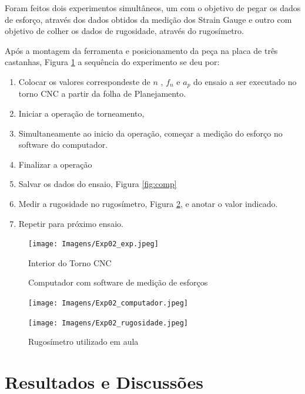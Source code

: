 \documentclass[deposito, acronym, symbols]{fei}
\begin{document}
Foram feitos dois experimentos simultâneos, um com o objetivo de pegar os dados de esforço, através dos dados obtidos da medição dos Strain Gauge e outro com objetivo de colher os dados de rugosidade, através do rugosímetro.

Após a montagem da ferramenta e posicionamento da peça na placa de três castanhas, Figura \ref{fig:exp} a sequência do experimento se deu por: 

\begin{enumerate}
    \item Colocar os valores correspondeste de $n$ , $f_n$ e $a_p$ do ensaio a ser executado no torno CNC a partir da folha de Planejamento.
    \item Iniciar a operação de torneamento,
    \item Simultaneamente ao inicio da operação, começar a medição do esforço no software do computador.
    \item Finalizar a operação
    \item Salvar os dados do ensaio, Figura \ref{fig:comp}
    \item Medir a rugosidade no rugosímetro, Figura \ref{fig:rugo}, e anotar o valor indicado.
    \item Repetir para próximo ensaio.
\end{enumerate}

\begin{figure}[!htp]
    \centering
    \caption{Interior do Torno CNC}
    \texttt{[image: Imagens/Exp02\_exp.jpeg]}
    \label{fig:exp}
\end{figure}


\begin{figure}[!htp]
  \centering
  \begin{minipage}{0.4\textwidth}
    \centering
    \caption{Computador com software de medição de esforços}
    \texttt{[image: Imagens/Exp02\_computador.jpeg]}
    \label{fig:comp}
  \end{minipage}
  \hfill
  \begin{minipage}{0.4\textwidth}
        \caption{Rugosímetro utilizado em aula}
    \texttt{[image: Imagens/Exp02\_rugosidade.jpeg]}
    \label{fig:rugo}
  \end{minipage}
\end{figure}

\chapter{Resultados e Discussões}
\end{document}
